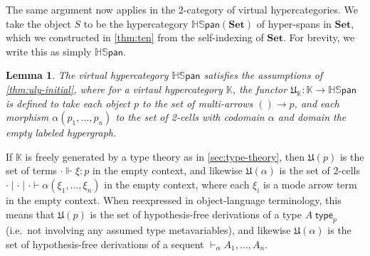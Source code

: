 \documentclass{article}
\newtheorem{lem}[thm]{Lemma}
\theoremstyle{definition}
\theoremstyle{remark}
\def\K{\mathbb{K}}
\def\U{\mathfrak{U}}
\def\hspan{\mathbb{HS}\mathsf{pan}}
\def\Set{\mathbf{Set}}
\def\type{\;\mathsf{type}}
\let\types\vdash
\let\Types\Vdash
\begin{document}
The same argument now applies in the 2-category of virtual hypercategories.
We take the object $S$ to be the hypercategory $\hspan(\Set)$ of hyper-spans in $\Set$, which we constructed in \cref{thm:ten} from the self-indexing of $\Set$.
For brevity, we write this as simply $\hspan$.

\begin{lem}
  The virtual hypercategory $\hspan$ satisfies the assumptions of \cref{thm:uly-initial}, where for a virtaul hypercategory $\K$, the functor $\U_\K : \K \to \hspan$ is defined to take each object $p$ to the set of multi-arrows $()\to p$, and each morphism $\alpha(p_1,\dots,p_n)$ to the set of 2-cells with codomain $\alpha$ and domain the empty labeled hypergraph.
\end{lem}

If $\K$ is freely generated by a type theory as in \cref{sec:type-theory}, then $\U(p)$ is the set of terms $\cdot \Types \xi:p$ in the empty context, and likewise $\U(\alpha)$ is the set of 2-cells $\cdot\mid\cdot\mid\cdot\types \alpha(\xi_1,\dots,\xi_n)$ in the empty context, where each $\xi_i$ is a mode arrow term in the empty context.
When reexpressed in object-language terminology, this means that $\U(p)$ is the set of hypothesis-free derivations of a type $A\type_p$ (i.e.\ not involving any assumed type metavariables), and likewise $\U(\alpha)$ is the set of hypothesis-free derivations of a sequent $\types_\alpha A_1,\dots,A_n$.
\end{document}
